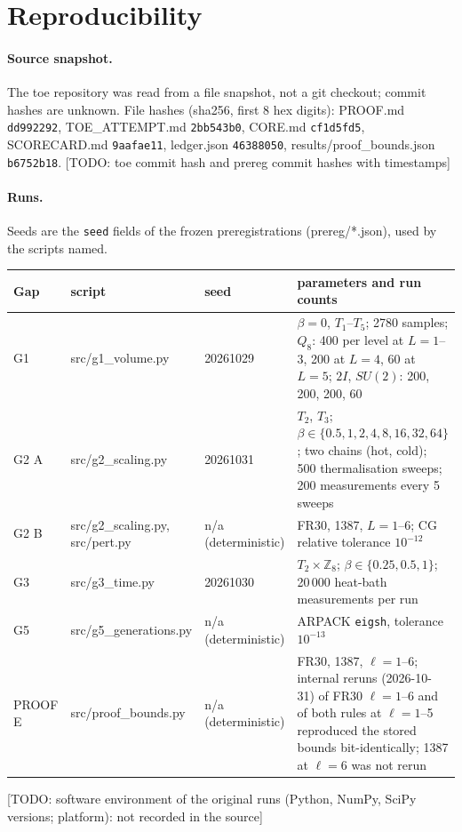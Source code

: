 \documentclass[11pt]{article}
\newcommand\todo[1]{{\color{red}\sffamily\small[TODO: #1]}}
\begin{document}
\section{Reproducibility}\label{app:repro}
\paragraph{Source snapshot.} The toe repository was read from a file snapshot, not a git checkout; commit hashes are unknown. File hashes (sha256, first 8 hex digits): PROOF.md \texttt{dd992292}, TOE\_ATTEMPT.md \texttt{2bb543b0}, CORE.md \texttt{cf1d5fd5}, SCORECARD.md \texttt{9aafae11}, ledger.json \texttt{46388050}, results/proof\_bounds.json \texttt{b6752b18}. \todo{toe commit hash and prereg commit hashes with timestamps}
\paragraph{Runs.} Seeds are the \texttt{seed} fields of the frozen preregistrations (prereg/*.json), used by the scripts named.
\begin{center}\small
\begin{tabular}{@{}p{}p{}p{}p{}@{}}\toprule
Gap & script & seed & parameters and run counts\\\midrule
G1 & src/g1\_volume.py & 20261029 & $\beta=0$, $T_1$--$T_5$; 2780 samples; $Q_8$: 400 per level at $L=1$--3, 200 at $L=4$, 60 at $L=5$; $2I$, $SU(2)$: 200, 200, 200, 60\\
G2 A & src/g2\_scaling.py & 20261031 & $T_2$, $T_3$; $\beta\in\{0.5,1,2,4,8,16,32,64\}$; two chains (hot, cold); 500 thermalisation sweeps; 200 measurements every 5 sweeps\\
G2 B & src/g2\_scaling.py, src/pert.py & n/a (deterministic) & FR30, 1387, $L=1$--6; CG relative tolerance $10^{-12}$\\
G3 & src/g3\_time.py & 20261030 & $T_2\times\mathbb{Z}_8$; $\beta\in\{0.25,0.5,1\}$; 20\,000 heat-bath measurements per run\\
G5 & src/g5\_generations.py & n/a (deterministic) & ARPACK \texttt{eigsh}, tolerance $10^{-13}$\\
PROOF E & src/proof\_bounds.py & n/a (deterministic) & FR30, 1387, $\ell=1$--6; internal reruns (2026-10-31) of FR30 $\ell=1$--6 and of both rules at $\ell=1$--5 reproduced the stored bounds bit-identically; 1387 at $\ell=6$ was not rerun\\\bottomrule
\end{tabular}
\end{center}
\todo{software environment of the original runs (Python, NumPy, SciPy versions; platform): not recorded in the source}



\end{document}
